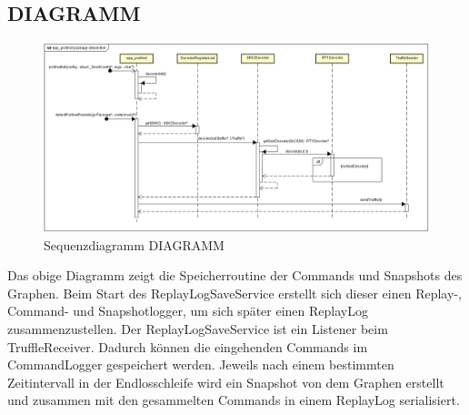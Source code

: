 \subsection{DIAGRAMM}
\begin{figure}[H]
  \centering
  \includegraphics[width=\textwidth]{../diagramimages/spp-profinet-package-dissection.png}
  \caption[Sequenzdiagramm DIAGRAMM]{Sequenzdiagramm DIAGRAMM}
\end{figure}

 Das obige Diagramm zeigt die Speicherroutine der Commands und Snapshots des Graphen. Beim Start des ReplayLogSaveService erstellt sich dieser einen Replay-, Command- und Snapshotlogger, um sich später einen ReplayLog zusammenzustellen. Der ReplayLogSaveService ist ein Listener beim TruffleReceiver. Dadurch können die eingehenden Commands im CommandLogger gespeichert werden. Jeweils nach einem bestimmten Zeitintervall in der Endlosschleife wird ein Snapshot von dem Graphen erstellt und zusammen mit den gesammelten Commands in einem ReplayLog serialisiert.